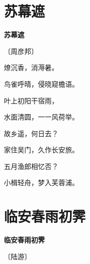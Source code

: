 \documentclass[12pt,UTF-8,openany,fontset=none]{ctexbook}
\begin{document}
\vspace{8pt}
\clearpage

\section{苏幕遮}


\begin{center}
    {\bfseries 苏幕遮}

    \vspace{18pt}

    \begin{large}\xuwen
        〔周彦邦〕
    \end{large}

\end{center}

    \vspace{18pt}  %

\begin{center}
    \begin{Large}

        燎沉香，消溽暑。

        鸟雀呼晴，侵晓窥檐语。

        叶上初阳干宿雨，

        水面清圆，一一风荷举。

        \vspace{18pt}  %

        故乡遥，何日去？

        家住吴门，久作长安旅。

        五月渔郎相忆否？

        小楫轻舟，梦入芙蓉浦。

    \end{Large}

\end{center}

\vspace{8pt}
\clearpage

\section{临安春雨初霁}


\begin{center}
    {\bfseries 临安春雨初霁}

    \vspace{18pt}

    \begin{large}\xuwen
        〔陆游〕
    \end{large}

\end{center}
\end{document}
